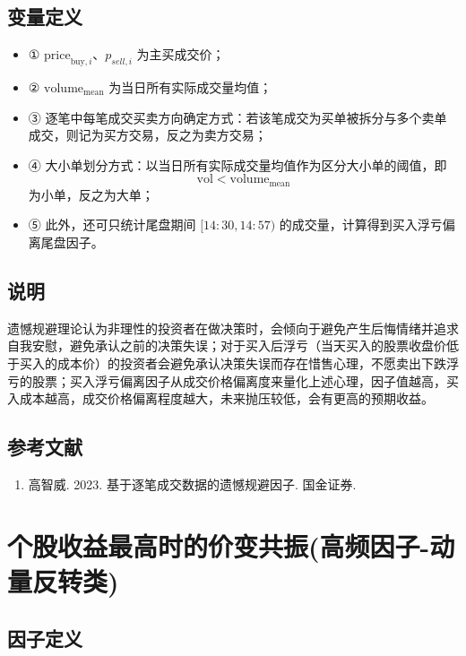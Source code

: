 \documentclass{article}
\begin{document}
\subsection{变量定义}
\begin{itemize}
    \item ① \( \mathrm{price}_{\mathrm{buy},i} 、p_{sell,i}\) 为主买成交价；
    \item ② \( \mathrm{volume}_{\mathrm{mean}} \) 为当日所有实际成交量均值；
    \item ③ 逐笔中每笔成交买卖方向确定方式：若该笔成交为买单被拆分与多个卖单成交，则记为买方交易，反之为卖方交易；
    \item ④ 大小单划分方式：以当日所有实际成交量均值作为区分大小单的阈值，即
        \begin{equation*}
            \mathrm{vol} < \mathrm{volume}_{\mathrm{mean}}
        \end{equation*}
        为小单，反之为大单；
    \item ⑤ 此外，还可只统计尾盘期间 \([14:30,14:57)\) 的成交量，计算得到买入浮亏偏离尾盘因子。
\end{itemize}

\subsection{说明}
遗憾规避理论认为非理性的投资者在做决策时，会倾向于避免产生后悔情绪并追求自我安慰，避免承认之前的决策失误；对于买入后浮亏（当天买入的股票收盘价低于买入的成本价）的投资者会避免承认决策失误而存在惜售心理，不愿卖出下跌浮亏的股票；买入浮亏偏离因子从成交价格偏离度来量化上述心理，因子值越高，买入成本越高，成交价格偏离程度越大，未来抛压较低，会有更高的预期收益。

\subsection{参考文献}
\begin{enumerate}
    \item 高智威. 2023. 基于逐笔成交数据的遗憾规避因子. 国金证券.
\end{enumerate}

\section{个股收益最高时的价变共振(高频因子-动量反转类)}

\subsection{因子定义}
\end{document}

